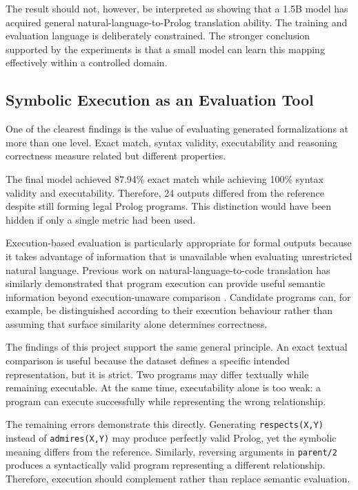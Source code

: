 \documentclass[11pt]{article} %
\theoremstyle{plain}
\theoremstyle{definition}
\begin{document}
The result should not, however, be interpreted as showing that a 1.5B model
has acquired general natural-language-to-Prolog translation ability. The
training and evaluation language is deliberately constrained. The stronger
conclusion supported by the experiments is that a small model can learn this
mapping effectively within a controlled domain.


\subsection{Symbolic Execution as an Evaluation Tool}

One of the clearest findings is the value of evaluating generated
formalizations at more than one level. Exact match, syntax validity,
executability and reasoning correctness measure related but different
properties.

The final model achieved 87.94\% exact match while achieving 100\% syntax
validity and executability. Therefore, 24 outputs differed from the reference
despite still forming legal Prolog programs. This distinction would have been
hidden if only a single metric had been used.

Execution-based evaluation is particularly appropriate for formal outputs
because it takes advantage of information that is unavailable when evaluating
unrestricted natural language. Previous work on natural-language-to-code
translation has similarly demonstrated that program execution can provide
useful semantic information beyond execution-unaware comparison \cite{shi2022execution}. Candidate
programs can, for example, be distinguished according to their execution
behaviour rather than assuming that surface similarity alone determines
correctness.

The findings of this project support the same general principle. An exact
textual comparison is useful because the dataset defines a specific intended
representation, but it is strict. Two programs may differ textually while
remaining executable. At the same time, executability alone is too weak: a
program can execute successfully while representing the wrong relationship.

The remaining errors demonstrate this directly. Generating
\texttt{respects(X,Y)} instead of \texttt{admires(X,Y)} may produce perfectly
valid Prolog, yet the symbolic meaning differs from the reference. Similarly,
reversing arguments in \texttt{parent/2} produces a syntactically valid program
representing a different relationship. Therefore, execution should complement
rather than replace semantic evaluation.
\end{document}
